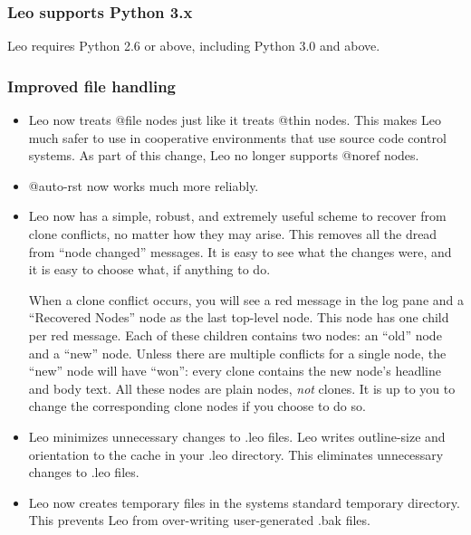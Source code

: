\documentclass[a4paper,10pt,english]{sphinxmanual}
\begin{document}
\subsubsection{Leo supports Python 3.x}
\label{what-is-new:leo-supports-python-3-x}
Leo requires Python 2.6 or above, including Python 3.0 and above.


\subsubsection{Improved file handling}
\label{what-is-new:improved-file-handling}\begin{itemize}
\item {} 
Leo now treats @file nodes just like it treats @thin nodes. This makes Leo
much safer to use in cooperative environments that use source code control
systems. As part of this change, Leo no longer supports @noref nodes.

\item {} 
@auto-rst now works much more reliably.

\item {} 
Leo now has a simple, robust, and extremely useful scheme to recover from
clone conflicts, no matter how they may arise. This removes all the dread from
``node changed'' messages. It is easy to see what the changes were, and it is
easy to choose what, if anything to do.

When a clone conflict occurs, you will see a red message in the log pane and a
``Recovered Nodes'' node as the last top-level node. This node has one child per
red message. Each of these children contains two nodes: an ``old'' node and a
``new'' node. Unless there are multiple conflicts for a single node, the ``new''
node will have ``won'': every clone contains the new node's headline and body
text. All these nodes are plain nodes, \emph{not} clones. It is up to you to change
the corresponding clone nodes if you choose to do so.

\item {} 
Leo minimizes unnecessary changes to .leo files. Leo writes outline-size and
orientation to the cache in your .leo directory. This eliminates unnecessary
changes to .leo files.

\item {} 
Leo now creates temporary files in the systems standard temporary directory.
This prevents Leo from over-writing user-generated .bak files.

\end{itemize}
\end{document}
